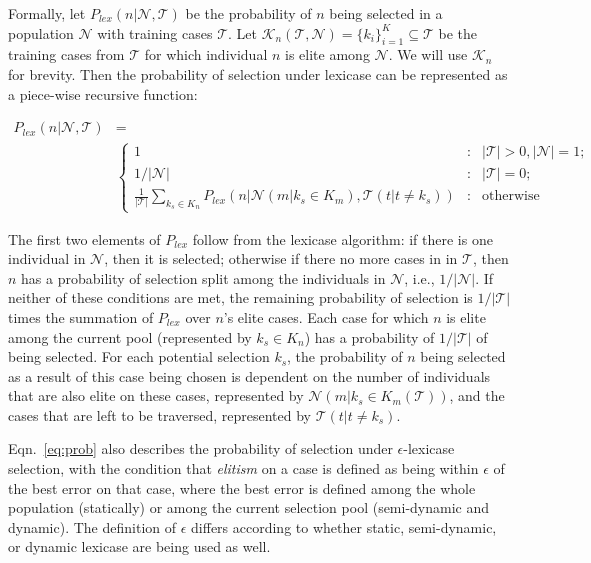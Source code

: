 \documentclass[twoside]{article}
\begin{document}
Formally, let $P_{lex}(n | \mathcal{N}, \mathcal{T})$ be the probability of $n$ being selected in a population $\mathcal{N}$ with training cases $\mathcal{T}$. Let $\mathcal{K}_n(\mathcal{T},\mathcal{N}) = \{k_i\}_{i=1}^K \subseteq \mathcal{T}$ be the training cases from $\mathcal{T}$ for which individual $n$ is elite among $\mathcal{N}$. We will use $\mathcal{K}_n$ for brevity. Then the probability of selection under lexicase can be represented as a piece-wise recursive function: 


{\scriptsize
\begin{align}\label{eq:prob}
P_{lex}(n | \mathcal{N}, \mathcal{T}) &= \\
 &\left\{\nonumber 
     \begin{array}{lcr}
       1 & : & |\mathcal{T}| >0, |\mathcal{N}| = 1; \\
       1/|\mathcal{N}| & : &|\mathcal{T}| = 0; \\ 
       \frac{1}{|\mathcal{T}|}\sum_{k_s \in K_n}{P_{lex} \left( n | \mathcal{N}(m|k_s \in K_m), \mathcal{T}(t|t \neq k_s) \right)} & : & \text{otherwise}
     \end{array}
   \right. 
\end{align}
}

The first two elements of $P_{lex}$ follow from the lexicase algorithm: if there is one individual in $\mathcal{N}$, then it is selected; otherwise if there no more cases in in $\mathcal{T}$, then $n$ has a probability of selection split among the individuals in $\mathcal{N}$, i.e.,  $1/|\mathcal{N}|$. If neither of these conditions are met, the remaining probability of selection is $1/|\mathcal{T}|$ times the summation of $P_{lex}$ over $n$'s elite cases. Each case for which $n$ is elite among the current pool (represented by $k_s \in K_n$) has a probability of $1/|\mathcal{T}|$ of being selected. For each potential selection $k_s$, the probability of $n$ being selected as a result of this case being chosen is dependent on the number of individuals that are also elite on these cases, represented by $\mathcal{N}(m|k_s \in K_m(\mathcal{T}))$, and the cases that are left to be traversed, represented by $\mathcal{T}(t|t \neq k_s)$. 

Eqn.~\ref{eq:prob} also describes the probability of selection under $\epsilon$-lexicase selection, with the condition that {\it elitism} on a case is defined as being within $\epsilon$ of the best error on that case, where the best error is defined among the whole population (statically) or among the current selection pool (semi-dynamic and dynamic). The definition of $\epsilon$ differs according to whether static, semi-dynamic, or dynamic lexicase are being used as well.   
\end{document}
